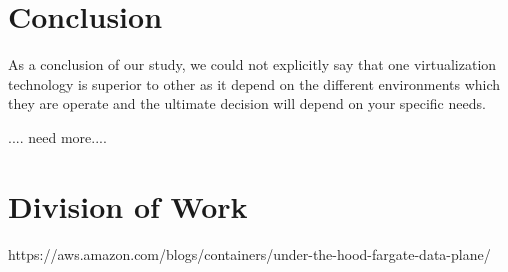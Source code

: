 \documentclass[11pt]{article}
\begin{document}
\section{Conclusion}

As a conclusion of our study, we could not explicitly say that one virtualization technology is superior to other as it depend on the different environments which they are operate and the ultimate decision will depend on your specific needs. 


.... need more....



\section{Division of Work}



https://aws.amazon.com/blogs/containers/under-the-hood-fargate-data-plane/
\end{document}
